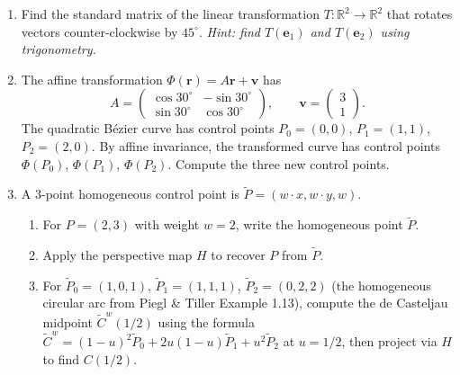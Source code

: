 \begin{enumerate}
\item Find the standard matrix of the linear transformation $T : \mathbb{R}^2 \to \mathbb{R}^2$
that rotates vectors counter-clockwise by $45^\circ$.
\emph{Hint: find $T(\mathbf{e}_1)$ and $T(\mathbf{e}_2)$ using trigonometry.}

\item The affine transformation $\Phi(\mathbf{r}) = A\mathbf{r} + \mathbf{v}$ has
\[
  A = \begin{pmatrix} \cos 30^\circ & -\sin 30^\circ \\ \sin 30^\circ & \cos 30^\circ \end{pmatrix},
  \qquad
  \mathbf{v} = \begin{pmatrix} 3 \\ 1 \end{pmatrix}.
\]
The quadratic B\'{e}zier curve has control points $P_0 = (0,0)$, $P_1 = (1,1)$, $P_2 = (2,0)$.
By affine invariance, the transformed curve has control points
$\Phi(P_0)$, $\Phi(P_1)$, $\Phi(P_2)$.
Compute the three new control points.

\item A $3$-point homogeneous control point is $\tilde{P} = (w \cdot x, w \cdot y, w)$.
\begin{enumerate}
  \item For $P = (2, 3)$ with weight $w = 2$, write the homogeneous point $\tilde{P}$.
  \item Apply the perspective map $H$ to recover $P$ from $\tilde{P}$.
  \item For $\tilde{P}_0 = (1,0,1)$, $\tilde{P}_1 = (1,1,1)$, $\tilde{P}_2 = (0,2,2)$
        (the homogeneous circular arc from Piegl \& Tiller Example 1.13),
        compute the de Casteljau midpoint
        $\tilde{C}^w(1/2)$ using the formula
        $\tilde{C}^w = (1-u)^2\tilde{P}_0 + 2u(1-u)\tilde{P}_1 + u^2\tilde{P}_2$
        at $u = 1/2$, then project via $H$ to find $C(1/2)$.
\end{enumerate}

\end{enumerate}

\clearpage
\fi
